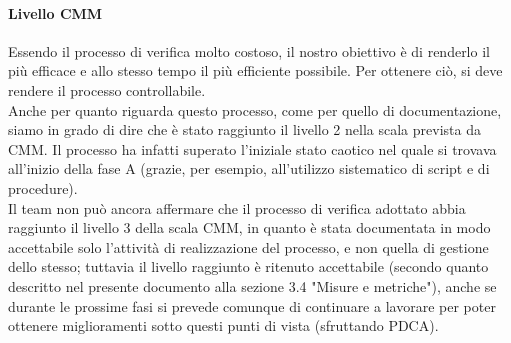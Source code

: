 \documentclass[../PianoDiQualifica.tex]{subfiles}
\begin{document}
\begin{appendices}
			\paragraph{Livello CMM}
			Essendo il processo di verifica molto costoso, il nostro obiettivo è di renderlo il più efficace e allo stesso tempo il più efficiente possibile. Per ottenere ciò, si deve rendere il processo controllabile. \\
			Anche per quanto riguarda questo processo, come per quello di documentazione, siamo in grado di dire che è stato raggiunto il livello 2 nella scala prevista da CMM. Il processo ha infatti superato l'iniziale stato caotico nel quale si trovava all'inizio della fase A (grazie, per esempio, all'utilizzo sistematico di script e di procedure). \\
			Il team non può ancora affermare che il processo di verifica adottato abbia raggiunto il livello 3 della scala CMM, in quanto è stata documentata in modo accettabile solo l'attività di realizzazione del processo, e non quella di gestione dello stesso; tuttavia il livello raggiunto è ritenuto accettabile (secondo quanto descritto nel presente documento alla sezione 3.4 "Misure e metriche"), anche se durante le prossime fasi si prevede comunque di continuare a lavorare per poter ottenere miglioramenti sotto questi punti di vista (sfruttando PDCA).
\end{appendices}
\end{document}
